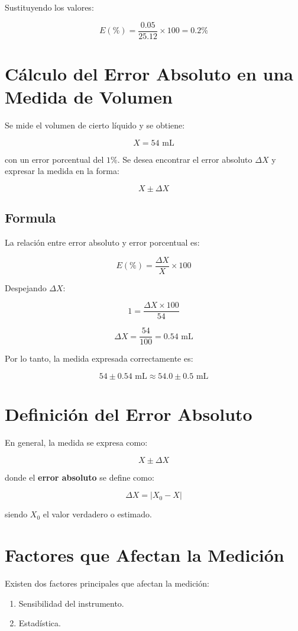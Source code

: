 Sustituyendo los valores:

\[
E (\%) = \frac{0.05}{25.12} \times 100 = 0.2\%
\]

\section{Cálculo del Error Absoluto en una Medida de Volumen}

Se mide el volumen de cierto líquido y se obtiene:

\[
X = 54 \text{ mL}
\]

con un error porcentual del \( 1\% \). Se desea encontrar el error absoluto \( \Delta X \) y expresar la medida en la forma:

\[
X \pm \Delta X
\]

\subsection{Formula}

La relación entre error absoluto y error porcentual es:

\[
E (\%) = \frac{\Delta X}{X} \times 100
\]

Despejando \( \Delta X \):

\[
1 = \frac{\Delta X \times 100}{54}
\]

\[
\Delta X = \frac{54}{100} = 0.54 \text{ mL}
\]

Por lo tanto, la medida expresada correctamente es:

\[
54 \pm 0.54 \text{ mL} \approx 54.0 \pm 0.5 \text{ mL}
\]

\section{Definición del Error Absoluto}

En general, la medida se expresa como:

\[
X \pm \Delta X
\]

donde el \textbf{error absoluto} se define como:

\[
\Delta X = |X_0 - X|
\]

siendo \( X_0 \) el valor verdadero o estimado.

\section{Factores que Afectan la Medición}

Existen dos factores principales que afectan la medición:
\begin{enumerate}
    \item Sensibilidad del instrumento.
    \item Estadística.
\end{enumerate}

